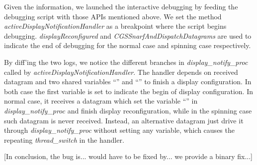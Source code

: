 Given the information, we launched the interactive debugging by 
feeding the debugging script with those APIs mentioned above. We set the method
\textit{activeDisplayNotificationHandler} as a breakpoint where the script begins
debugging. \textit{displayReconfigured} and \textit{CGSSnarfAndDispatchDatagrams}
are used to indicate the end of debugging for the normal case and spinning case
respectively.

By diff'ing the two logs, we notice the different
branches in \textit{display\_notify\_proc} called by
\textit{activeDisplayNotificationHandler}. The handler depends on received
datagram and two shared variables ``'' and
``'' to finish a display configuration. In
both case the first variable is set to indicate the begin of display
configuration. In normal case, it receives a datagram which set the variable
``'' in \textit{display\_notify\_proc} and
finish display reconfiguration, while in the spinning case such datagram
is never received. Instead, an alternative datagram just drive it through
\textit{display\_notify\_proc} without setting any variable, which causes the
repeating \textit{thread\_switch} in the handler.

[In conclusion, the bug is... would have to be fixed by... we provide a binary fix...]

